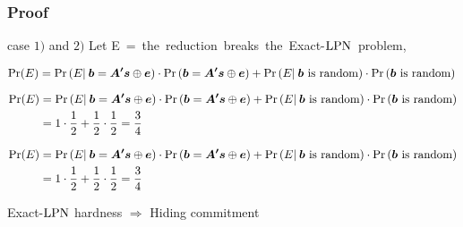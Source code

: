 \begin{frame}
\frametitle{Proof}

  \begin{center}
  \end{center}

  \begin{block}{case $1)$ and $2)$ }
  Let \mbox{E = {the reduction breaks the Exact-$\mathrm{LPN}$ problem}},  
  \begin{overprint}
  \begin{equation*}
     \Pr(E) = \Pr \left( E | \:\boldsymbol{b}  = \boldsymbol{A'} \boldsymbol{s} \mathbin{\oplus} \boldsymbol{e}  \right)  \cdot  \Pr \left( \boldsymbol{b}  = \boldsymbol{A'} \boldsymbol{s} \mathbin{\oplus} \boldsymbol{e}  \right)  + \Pr \left( E   | \: \boldsymbol{b} \text{ is random}  \right)   \cdot \Pr \left(   \boldsymbol{b} \text{ is random} \right) \\
  \end{equation*}

  \begin{align*}
    \Pr(E) &= \Pr \left( E | \:\boldsymbol{b}  = \boldsymbol{A'} \boldsymbol{s} \mathbin{\oplus} \boldsymbol{e}  \right)  \cdot  \Pr \left( \boldsymbol{b}  = \boldsymbol{A'} \boldsymbol{s} \mathbin{\oplus} \boldsymbol{e}  \right)  + \Pr \left( E   | \: \boldsymbol{b} \text{ is random}  \right)   \cdot \Pr \left(   \boldsymbol{b} \text{ is random} \right) \\
	  &=  1  \cdot   \frac{1}{2}  +  \frac{1}{2}  \cdot  \frac{1}{2} = \frac{3}{4} 
  \end{align*}

  \begin{align*}
    \Pr(E) &= \Pr \left( E | \:\boldsymbol{b}  = \boldsymbol{A'} \boldsymbol{s} \mathbin{\oplus} \boldsymbol{e}  \right)  \cdot  \Pr \left( \boldsymbol{b}  = \boldsymbol{A'} \boldsymbol{s} \mathbin{\oplus} \boldsymbol{e}  \right)  + \Pr \left( E   | \: \boldsymbol{b} \text{ is random}  \right)   \cdot \Pr \left(   \boldsymbol{b} \text{ is random} \right) \\
	  &=  1  \cdot   \frac{1}{2}  +  \frac{1}{2}  \cdot  \frac{1}{2} = \frac{3}{4} 
  \end{align*}
  \begin{center}   
  \alert{Exact-$\mathrm{LPN}$ hardness $\Rightarrow$ Hiding commitment}
  \end{center}  
  \end{overprint}

  \end{block}

\end{frame}

